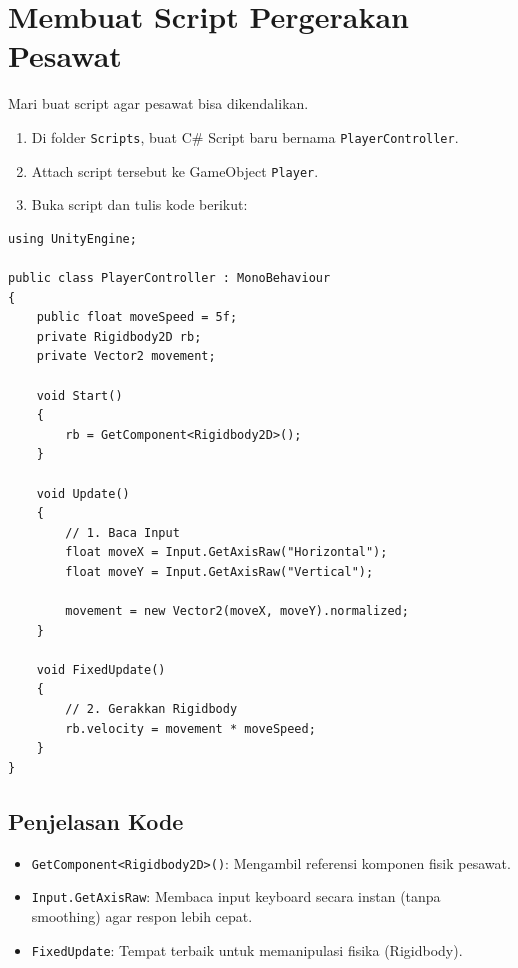 
\section{Membuat Script Pergerakan Pesawat}

Mari buat script agar pesawat bisa dikendalikan.

\begin{enumerate}
    \item Di folder \texttt{Scripts}, buat C\# Script baru bernama \texttt{PlayerController}.
    \item Attach script tersebut ke GameObject \texttt{Player}.
    \item Buka script dan tulis kode berikut:
\end{enumerate}

\begin{lstlisting}[language={[Sharp]C}, caption=PlayerController.cs (Movement)]
using UnityEngine;

public class PlayerController : MonoBehaviour
{
    public float moveSpeed = 5f;
    private Rigidbody2D rb;
    private Vector2 movement;

    void Start()
    {
        rb = GetComponent<Rigidbody2D>();
    }

    void Update()
    {
        // 1. Baca Input
        float moveX = Input.GetAxisRaw("Horizontal");
        float moveY = Input.GetAxisRaw("Vertical");
        
        movement = new Vector2(moveX, moveY).normalized;
    }

    void FixedUpdate()
    {
        // 2. Gerakkan Rigidbody
        rb.velocity = movement * moveSpeed;
    }
}
\end{lstlisting}

\subsection{Penjelasan Kode}
\begin{itemize}
    \item \texttt{GetComponent<Rigidbody2D>()}: Mengambil referensi komponen fisik pesawat.
    \item \texttt{Input.GetAxisRaw}: Membaca input keyboard secara instan (tanpa smoothing) agar respon lebih cepat.
    \item \texttt{FixedUpdate}: Tempat terbaik untuk memanipulasi fisika (Rigidbody).
\end{itemize}
